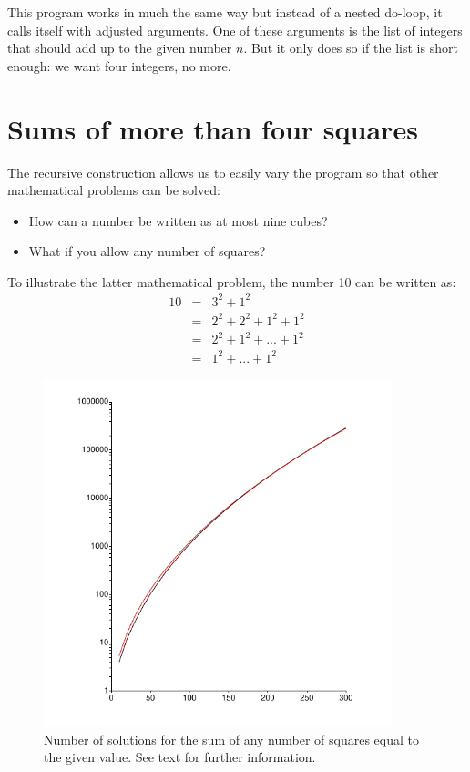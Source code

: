 \documentclass[onecolumn]{article}
\begin{document}
This program works in much the same way but instead of a nested do-loop, it calls itself with
adjusted arguments. One of these arguments is the list of integers that should add up to the
given number $n$. But it only does so if the list is short enough: we want four integers, no more.

\section{Sums of more than four squares}

The recursive construction allows us to easily vary the program so that other mathematical problems
can be solved:
\begin{itemize}
\item
How can a number be written as at most nine cubes?
\item
What if you allow any number of squares?
\end{itemize}

To illustrate the latter mathematical problem, the number 10 can be written as:
\begin{eqnarray*}
    10 &=& 3^2 + 1^2 \\
       &=& 2^2 + 2^2 + 1^2 + 1^2 \\
       &=& 2^2 + 1^2 + ... + 1^2 \\
       &=& 1^2 + ... + 1^2
\end{eqnarray*}

\begin{figure}[H]
\caption{Number of solutions for the sum of any number of squares equal to the given value. See text for further information.}
\label{unlimitedgraph}
\begin{center}
\includegraphics[width=0.9\textwidth]{number_solutions.pdf}
\end{center}
\end{figure}
\end{document}
